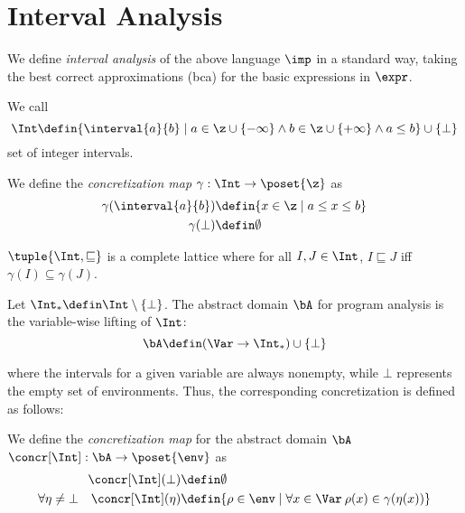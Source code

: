 \section{Interval Analysis}

We define \emph{interval analysis} of the above language \(\imp\) in a
standard way, taking the best correct approximations (bca) for the
basic expressions in \(\expr\).
  
\begin{definition}
  We call
  \[ \Int \defin \{ \interval{a}{b} \mid a \in \z \cup
  \{-\infty\} \wedge b \in \z \cup \{+\infty\} \wedge a\leq b \} \cup
  \{\bot\} \] set of integer intervals.
\end{definition}

\begin{definition}
  We define the \emph{concretization map} \(\gamma:\Int \to
  \poset{\z}\) as
  \begin{align*}
    \gamma(\interval{a}{b}) & \defin \{x\in \z \mid a \leq x \leq b\} \\
    \gamma(\bot) & \defin \emptyset
  \end{align*}
\end{definition}

\begin{observation}
  \(\tuple{\Int,\sqsubseteq}\) is a complete lattice where for all
  \(I,J\in \Int\), \(I\sqsubseteq J\) iff \(\gamma(I) \subseteq
  \gamma(J)\).
\end{observation}

\begin{definition}
  Let \(\Int_* \defin \Int \setminus \{\bot\}\). The abstract
  domain \(\bA\) for program analysis is the variable-wise
  lifting of \(\Int\): \[ \bA \defin (\Var \to \Int_*) \cup \{
  \bot \} \]
\end{definition}

where the intervals for a given variable are always nonempty, while
\(\bot\) represents the empty set of environments.  Thus, the
corresponding concretization is defined as follows:

\begin{definition}
  We define the \emph{concretization map} for the abstract domain
  \(\bA\) \(\concr[\Int] : \bA \to \poset{\env}\) as
  \begin{align*}
    \concr[\Int](\bot) &\defin \emptyset\\
    \forall \eta\neq \bot \quad \concr[\Int](\eta) &\defin \{\rho \in \env \mid \forall x\in \Var \: \rho(x) \in \gamma(\eta(x))\} 
  \end{align*}
\end{definition}

